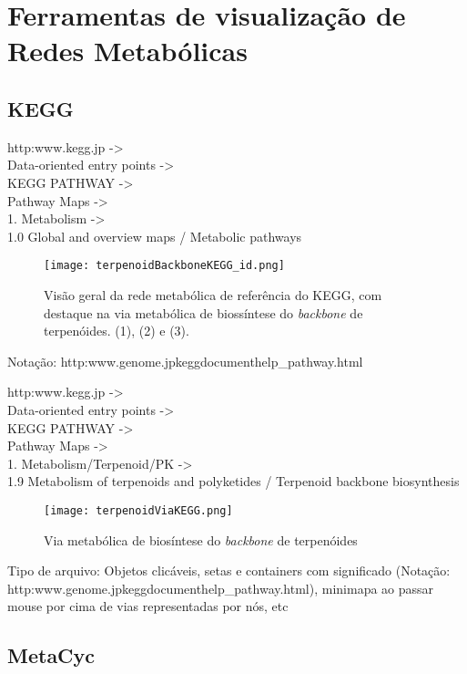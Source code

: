 \chapter{Ferramentas de visualização de Redes Metabólicas}


\section{KEGG}

http:\/\/www.kegg.jp\/ -> \\ Data-oriented entry points  -> \\KEGG PATHWAY ->\\ Pathway Maps -> \\1. Metabolism  -> \\1.0 Global and overview maps / Metabolic pathways

\begin{figure}[h]
\centering
\texttt{[image: terpenoidBackboneKEGG\_id.png]}
\caption{Visão geral da rede metabólica de referência do KEGG, com destaque na via metabólica de biossíntese do \textit{backbone} de terpenóides. (1), (2) e (3).}
\label{terpenoidBackboneKEGG}
\end{figure}


Notação: http:\/\/www.genome.jp\/kegg\/document\/help\_pathway.html



http:\/\/www.kegg.jp\/ -> \\ Data-oriented entry points  -> \\KEGG PATHWAY ->\\ Pathway Maps -> \\1. Metabolism/Terpenoid/PK   -> \\1.9 Metabolism of terpenoids and polyketides / Terpenoid backbone biosynthesis

\begin{figure}[h]
\centering
\texttt{[image: terpenoidViaKEGG.png]}
\caption{Via metabólica de biosíntese do \textit{backbone} de terpenóides}
\label{terpenoidBackboneKEGG}
\end{figure}


Tipo de arquivo:
Objetos clicáveis, setas e containers com significado (Notação: http:\/\/www.genome.jp\/kegg\/document\/help\_pathway.html), minimapa ao passar mouse por cima de vias representadas por nós, etc

\section{MetaCyc}


